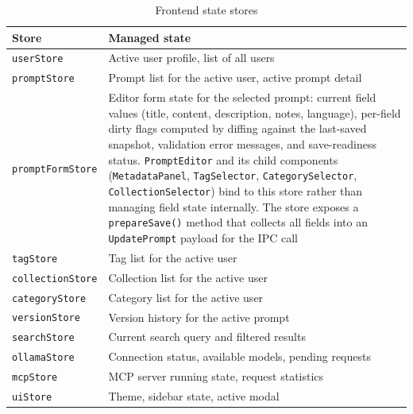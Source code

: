 \documentclass[a4paper, 11pt, oneside]{report}
\begin{document}
\begin{table}[H]
  \centering
  \caption{Frontend state stores}
  \label{tab:stores}
  \begin{tabularx}{\textwidth}{l X}
    \toprule
    \textbf{Store} & \textbf{Managed state} \\
    \midrule
    \texttt{userStore}       & Active user profile, list of all users \\
    \texttt{promptStore}     & Prompt list for the active user, active prompt detail \\
    \texttt{promptFormStore} & Editor form state for the selected prompt: current
                               field values (title, content, description,
                               notes, language), per-field dirty flags computed by
                               diffing against the last-saved snapshot, validation
                               error messages, and save-readiness status.
                               \texttt{PromptEditor} and its child components
                               (\texttt{MetadataPanel}, \texttt{TagSelector},
                               \texttt{CategorySelector}, \texttt{CollectionSelector})
                               bind to this store rather than managing field state
                               internally.  The store exposes a \texttt{prepareSave()}
                               method that collects all fields into an
                               \texttt{UpdatePrompt} payload for the IPC call \\
    \texttt{tagStore}        & Tag list for the active user \\
    \texttt{collectionStore} & Collection list for the active user \\
    \texttt{categoryStore}   & Category list for the active user \\
    \texttt{versionStore}    & Version history for the active prompt \\
    \texttt{searchStore}     & Current search query and filtered results \\
    \texttt{ollamaStore}     & Connection status, available models, pending requests \\
    \texttt{mcpStore}        & MCP server running state, request statistics \\
    \texttt{uiStore}         & Theme, sidebar state, active modal \\
    \bottomrule
  \end{tabularx}
\end{table}
\end{document}
